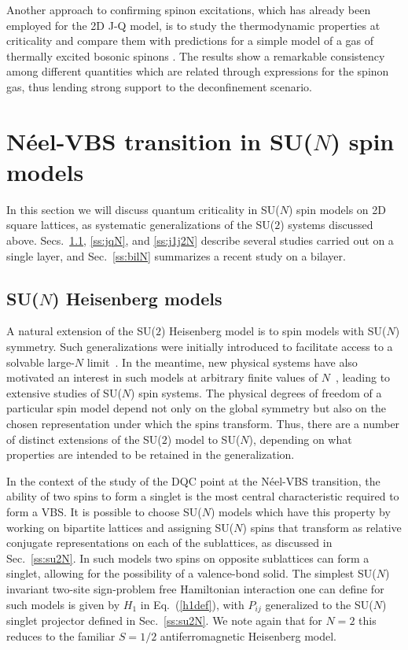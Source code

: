 \documentclass[10pt,pre,aps,twocolumn,showpacs,subscriptaddresses,floatfix]{revtex4}
\begin{document}
Another approach to confirming spinon excitations, which has already been employed for the 2D J-Q model, is to study the thermodynamic properties at 
criticality and compare them with predictions for a simple model of a gas of thermally excited bosonic spinons \cite{Sandvik11a}. The results show a remarkable 
consistency among different quantities which are related through expressions for the spinon gas, thus lending strong support to the deconfinement scenario.

\section{N\'eel-VBS transition in SU($N$) spin models}
\label{sec:sunmodels}

In this section we will discuss quantum criticality in SU($N$) spin models on 2D square lattices, as systematic generalizations of the SU($2$) systems 
discussed above. Secs.~\ref{ss:j1N}, \ref{ss:jqN}, and \ref{ss:j1j2N} describe several studies carried out on a single layer, and Sec.~\ref{ss:bilN} summarizes 
a recent study on a bilayer. 

\subsection{SU($N$) Heisenberg models}
\label{ss:j1N}
A natural extension of the SU($2$) Heisenberg model is to spin models with SU($N$) symmetry. Such generalizations were initially introduced to
facilitate access to a solvable large-$N$ limit~\cite{affleck1985:lgN,Read89}. In the meantime, new physical systems have also motivated an interest 
in such models at arbitrary finite values of $N$~\cite{gorshkov2010:sun,kugel1982:kk}, leading to extensive studies of SU($N$) spin systems. The 
physical degrees of freedom of a particular spin model depend not only on the global symmetry but also on the chosen representation under which the 
spins transform. Thus, there are a number of distinct extensions of the SU($2$) model to SU($N$), depending on what properties are intended to be retained 
in the generalization. 

In the context of the study of the DQC point at the N\'eel-VBS transition, the ability of two spins to form a singlet is the most
central characteristic required to form a VBS. It is possible to choose SU($N$) models which have this property by working on bipartite lattices and
assigning SU($N$) spins that transform as relative conjugate representations on each of the sublattices, as discussed in Sec.~\ref{ss:su2N}. In such 
models two spins on opposite sublattices can form a singlet, allowing for the possibility of a valence-bond solid.  The simplest 
SU($N$) invariant two-site sign-problem free Hamiltonian interaction one can define for such models is given by $H_1$ in Eq.~(\ref{h1def}), with $P_{ij}$ 
generalized to the SU($N$) singlet projector defined in Sec.~\ref{ss:su2N}. We note again that for $N=2$ this reduces to the familiar $S=1/2$ 
antiferromagnetic Heisenberg model. 
\end{document}
